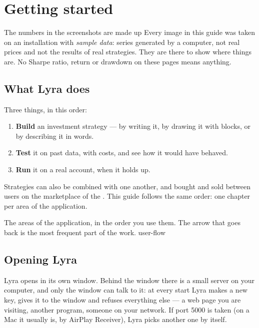 \chapter{Getting started}\label{cap:getting-started}

\begin{attenzione}{The numbers in the screenshots are made up}
Every image in this guide was taken on an installation with \emph{sample
data}: series generated by a computer, not real prices and not the results
of real strategies. They are there to show where things are. No Sharpe ratio,
return or drawdown on these pages means anything.
\end{attenzione}

\section{What Lyra does}\label{sez:what-it-does}

Three things, in this order:

\begin{enumerate}
  \item \textbf{Build} an investment strategy --- by writing it, by drawing
        it with blocks, or by describing it in words.
  \item \textbf{Test} it on past data, with costs, and see how it would have
        behaved.
  \item \textbf{Run} it on a real account, when it holds up.
\end{enumerate}

\noindent
Strategies can also be combined with one another, and bought and sold
between users on the marketplace of the . This guide follows
the same order: one chapter per area of the application.

  {The areas of the application, in the order you use them. The arrow that
   goes back is the most frequent part of the work.}
  {user-flow}

\section{Opening Lyra}\label{sez:opening}

Lyra opens in its own window. Behind the window there is a small server on
your computer, and only the window can talk to it: at every start Lyra makes
a new key, gives it to the window and refuses everything else --- a web page
you are visiting, another program, someone on your network. If port 5000 is
taken (on a Mac it usually is, by AirPlay Receiver), Lyra picks another one
by itself.

